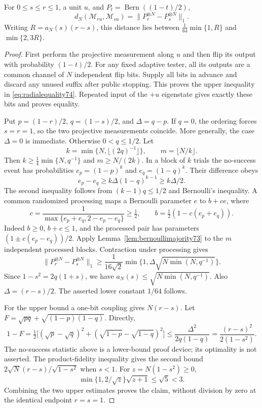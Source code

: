 \begin{lemma}\label{lem:radial74}
For $0\le s\le r\le1$, a unit $u$, and $P_t=\operatorname{Bern}((1-t)/2)$,
\begin{equation}\label{eq:radialequality74}
 d_N(\mathcal M_{ru},\mathcal M_{su})
       =\|P_r^{\otimes N}-P_s^{\otimes N}\|_1.
\end{equation}
Writing $R=a_N(s)(r-s)$, this distance lies between
$\frac1{64}\min\{1,R\}$ and $\min\{2,3R\}$.
\end{lemma}
\begin{proof}
First perform the projective measurement along $u$ and then flip its
output with probability $(1-t)/2$. For any fixed adaptive tester, all
its outputs are a common channel of $N$ independent flip bits. Supply
all bits in advance and discard any unused suffix after public stopping. This
proves the upper inequality in \eqref{eq:radialequality74}. Repeated
input of the $+u$ eigenstate gives exactly these bits and proves equality.

Put $p=(1-r)/2$, $q=(1-s)/2$, and $\Delta=q-p$. If $q=0$, the ordering forces $s=r=1$, so the two projective
measurements coincide. More generally, the case $\Delta=0$ is immediate. Otherwise $0<q\le1/2$. Let
\[
 k=\min\{N,\lfloor(2q)^{-1}\rfloor\},\qquad m=\lfloor N/k\rfloor.
\]
Then $k\ge\frac14\min\{N,q^{-1}\}$ and $m\ge N/(2k)$.
In a block of $k$ trials the no-success event has probabilities
$e_p=(1-p)^k$ and $e_q=(1-q)^k$. Their difference obeys
\[
 e_p-e_q\ge k\Delta(1-q)^{k-1}\ge k\Delta/2.
\]
The second inequality follows from $(k-1)q\le1/2$ and Bernoulli's
inequality. A common randomized processing maps a Bernoulli parameter
$e$ to $b+ce$, where
\[
 c=\frac1{\max\{e_p+e_q,2-e_p-e_q\}}\ge\tfrac12,
 \qquad b=\tfrac12(1-c(e_p+e_q)).
\]
Indeed $b\ge0$, $b+c\le1$, and the processed pair has parameters
$(1\pm c(e_p-e_q))/2$. Apply
Lemma~\ref{lem:bernoullimajority73} to the $m$ independent processed
blocks. Contraction under processing gives
\[
 \|P_r^{\otimes N}-P_s^{\otimes N}\|_1
 \ge\frac1{16\sqrt2}\min\{1,\Delta\sqrt{N\min(N,q^{-1})}\}.
\]
Since $1-s^2=2q(1+s)$, we have
$a_N(s)\le\sqrt{N\min(N,q^{-1})}$. Also $\Delta=(r-s)/2$.
The asserted lower constant $1/64$ follows.

For the upper bound a one-bit coupling gives $N(r-s)$. Let
$F=\sqrt{pq}+\sqrt{(1-p)(1-q)}$. Directly,
\[
 1-F=\tfrac12\bigl[(\sqrt p-\sqrt q)^2+
                 (\sqrt{1-p}-\sqrt{1-q})^2\bigr]
 \le\frac{\Delta^2}{2q(1-q)}
 =\frac{(r-s)^2}{2(1-s^2)}.
\]
The no-success statistic above is a lower-bound proof device; its
optimality is not asserted. The product-fidelity inequality gives the second bound
$2\sqrt N(r-s)/\sqrt{1-s^2}$ when $s<1$. For $z=N(1-s^2)\ge0$,
\[
 \min\{1,2/\sqrt z\}\sqrt{z+1}\le\sqrt5<3.
\]
Combining the two upper estimates proves the claim, without division
by zero at the identical endpoint $r=s=1$.
\end{proof}

